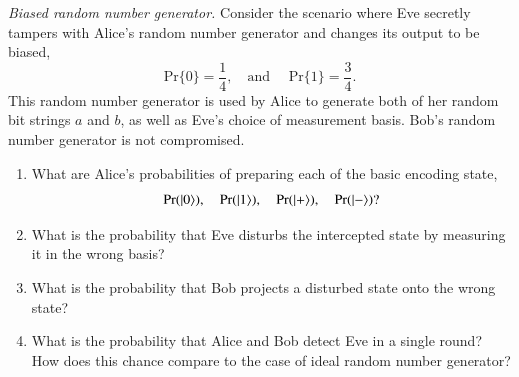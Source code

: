 \begin{exercise}
\emph{Biased random number generator.} Consider the scenario where Eve secretly tampers with Alice's random number generator and changes its output to be biased,
\begin{equation*}
    \text{Pr}\{0\} = \frac{1}{4}, \quad\text{and } \quad \text{Pr}\{1\} = \frac{3}{4}.
\end{equation*}
This random number generator is used by Alice to generate both of her random bit strings $a$ and $b$, as well as Eve's choice of measurement basis.
Bob's random number generator is not compromised.
\begin{enumerate}[label=(\alph*)]
    \item What are Alice's probabilities of preparing each of the basic encoding state,
    \begin{equation}
        \text{Pr}(\ket{0}), \quad \text{Pr}(\ket{1}), \quad \text{Pr}(\ket{+}), \quad \text{Pr}(\ket{-})?
    \end{equation}
    \item What is the probability that Eve disturbs the intercepted state by measuring it in the wrong basis?
    \item What is the probability that Bob projects a disturbed state onto the wrong state?
    \item What is the probability that Alice and Bob detect Eve in a single round? How does this chance compare to the case of ideal random number generator?
\end{enumerate}
\end{exercise}
